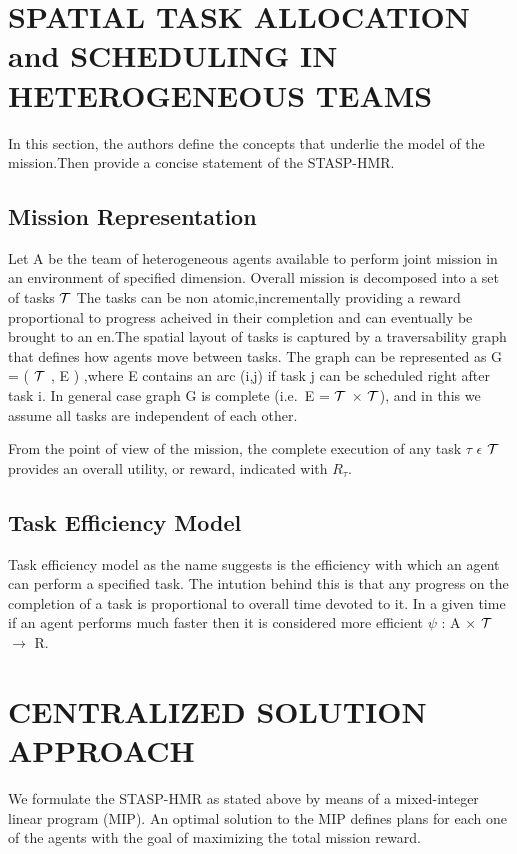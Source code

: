 \documentclass[conference]{IEEEtran}
\begin{document}
\section{SPATIAL TASK ALLOCATION and SCHEDULING IN HETEROGENEOUS TEAMS}
In this section, the authors define the concepts that underlie the model of the mission.Then provide a concise statement of the STASP-HMR.
\subsection{Mission Representation}
Let A be the team of heterogeneous agents available to perform joint mission in an environment of specified dimension. Overall mission is decomposed into a set of tasks \( \mathcal{T} \) The tasks can be non atomic,incrementally providing a reward proportional to progress acheived in their completion and can eventually be brought to an en.The spatial layout of tasks is captured by a traversability graph that defines how agents move between tasks\cite{feo2016decentralized}.
The graph can be represented as G = ( \( \mathcal{T} \) , E ) ,where E contains an arc (i,j) if task j can be scheduled right after task i. In general case graph G is complete (i.e.\, E = \( \mathcal{T} \) \( \times \) \( \mathcal{T} \)), and in this we assume all tasks are independent of each other.

From the point of view of the mission, the complete execution of any task \( \tau \) \( \epsilon \) \( \mathcal{T} \) provides an overall utility, or reward, indicated with \( R_{\tau} \).

\subsection{Task Efficiency Model}
Task efficiency model as the name suggests is the efficiency with which an agent can perform a specified task. The intution behind this is that any progress on the completion of a task is proportional to overall time devoted to it. In a given time if an agent performs much faster then it is considered more efficient \( \psi \) : A \( \times \) \( \mathcal{T} \) \( \to \) {R}\cite{feo2016decentralized}. 

\section{CENTRALIZED SOLUTION APPROACH}
We formulate the STASP-HMR as stated above by means of a mixed-integer linear program (MIP). An optimal solution to the MIP defines plans for each one of the agents with the goal of maximizing the total mission reward.
\end{document}
